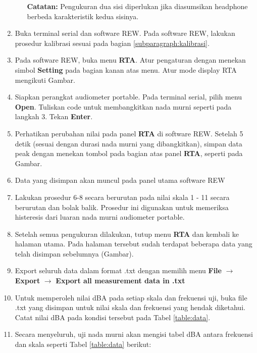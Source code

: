\documentclass{article}
\begin{document}
\begin{enumerate}
\begin{itemize}
				\textbf{Catatan:} Pengukuran dua sisi diperlukan jika diasumsikan headphone berbeda karakteristik kedua sisinya.
			\end{itemize}	
		
			\item Buka terminal serial dan software REW. Pada software REW, lakukan prosedur kalibrasi sesuai pada bagian \ref{subparagraph:kalibrasi}. 
			
			\item Pada software REW, buka menu {\bf RTA}. Atur pengaturan dengan menekan simbol {\bf Setting} pada bagian kanan atas menu. Atur mode display RTA mengikuti Gambar. 
			
			\item Siapkan perangkat audiometer portable. Pada terminal serial, pilih menu {\bf Open}. Tuliskan code untuk membangkitkan nada murni seperti pada langkah 3. Tekan {\bf Enter}. 
			
			\item Perhatikan perubahan nilai pada panel {\bf RTA} di software REW. Setelah 5 detik (sesuai dengan durasi nada murni yang dibangkitkan), simpan data peak dengan menekan tombol pada bagian atas panel {\bf RTA}, seperti pada Gambar.
			
			\item Data yang disimpan akan muncul pada panel utama software REW
			
			\item Lakukan prosedur 6-8 secara berurutan pada nilai skala 1 - 11 secara berurutan dan bolak balik. Prosedur ini digunakan untuk memeriksa histeresis dari luaran nada murni audiometer portable.
			
			\item Setelah semua pengukuran dilakukan, tutup menu {\bf RTA} dan kembali ke halaman utama. Pada halaman tersebut sudah terdapat beberapa data yang telah disimpan sebelumnya (Gambar).
			
			\item Export seluruh data dalam format .txt dengan memilih menu {\bf File} $\rightarrow$ {\bf Export}  $\rightarrow$ {\bf Export all measurement data in .txt}
			
			\item Untuk memperoleh nilai dBA pada setiap skala dan frekuensi uji, buka file .txt yang disimpan untuk nilai skala dan frekuensi yang hendak diketahui. Catat nilai dBA pada kondisi tersebut pada Tabel \ref{table:data}. 
		
			\item Secara menyeluruh, uji nada murni akan mengisi tabel dBA antara frekuensi dan skala seperti Tabel \ref{table:data} berikut:
			

\end{enumerate}
\end{document}
